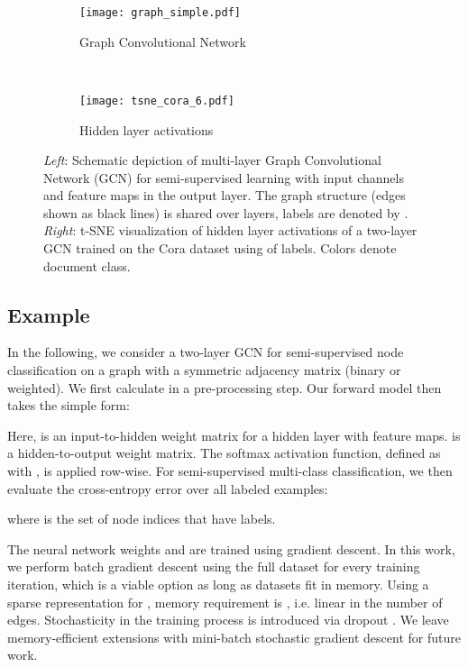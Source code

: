 \documentclass{article} \usepackage{iclr2017_conference,times}
\makeatletter
\newcommand*{\ie}{i.e.\@\xspace}
\makeatother
\begin{document}
\begin{figure}[htp]
    \centering
    \begin{subfigure}[b]{0.67\textwidth}
        \centering
    \texttt{[image: graph\_simple.pdf]}
        \caption{Graph Convolutional Network}
        \label{fig:model-a}
    \end{subfigure}~
    \begin{subfigure}[b]{0.33\textwidth}
        \centering
        \texttt{[image: tsne\_cora\_6.pdf]}
        \caption{Hidden layer activations}
        \label{fig:model-b}
    \end{subfigure}

    \caption{\emph{Left}: Schematic depiction of multi-layer Graph Convolutional Network (GCN) for semi-supervised learning with  input channels and  feature maps in the output layer. The graph structure (edges shown as black lines) is shared over layers, labels are denoted by . \emph{Right}: t-SNE \citep{maaten2008visualizing} visualization of hidden layer activations of a two-layer GCN trained on the Cora dataset \citep{sen2008collective} using  of labels. Colors denote document class.}
    \label{fig:model}
\end{figure}

\subsection{Example} \label{sec:model-example} In the following, we consider a two-layer GCN for semi-supervised node classification on a graph with a symmetric adjacency matrix  (binary or weighted). We first calculate  in a pre-processing step. Our forward model then takes the simple form:

Here,  is an input-to-hidden weight matrix for a hidden layer with  feature maps.  is a hidden-to-output weight matrix. The softmax activation function, defined as  with , is applied row-wise. For semi-supervised multi-class classification, we then evaluate the cross-entropy error over all labeled examples:

where  is the set of node indices that have labels.

The neural network weights  and  are trained using gradient descent. In this work, we perform batch gradient descent using the full dataset for every training iteration, which is a viable option as long as datasets fit in memory. Using a sparse representation for , memory requirement is , \ie linear in the number of edges. Stochasticity in the training process is introduced via dropout \citep{srivastava2014dropout}. We leave memory-efficient extensions with mini-batch stochastic gradient descent for future work.
\end{document}
